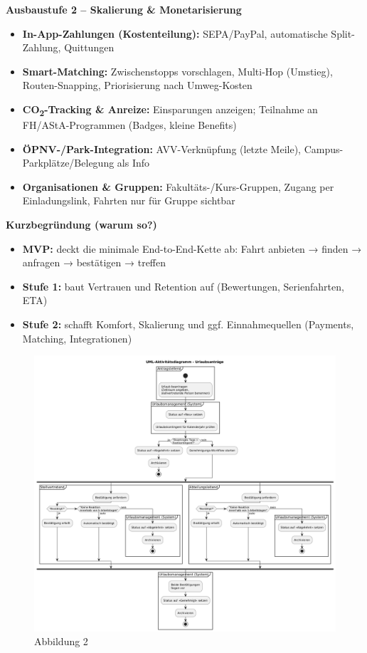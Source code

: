 \documentclass[12pt]{article}
\begin{document}
\textbf{Ausbaustufe 2 – Skalierung \& Monetarisierung}

\begin{itemize}
  \item \textbf{In-App-Zahlungen (Kostenteilung):} SEPA/PayPal, automatische Split-Zahlung, Quittungen
  \item \textbf{Smart-Matching:} Zwischenstopps vorschlagen, Multi-Hop (Umstieg), Routen-Snapping, Priorisierung nach Umweg-Kosten
  \item \textbf{CO\textsubscript{2}-Tracking \& Anreize:} Einsparungen anzeigen; Teilnahme an FH/AStA-Programmen (Badges, kleine Benefits)
  \item \textbf{ÖPNV-/Park-Integration:} AVV-Verknüpfung (letzte Meile), Campus-Parkplätze/Belegung als Info
  \item \textbf{Organisationen \& Gruppen:} Fakultäts-/Kurs-Gruppen, Zugang per Einladungslink, Fahrten nur für Gruppe sichtbar
\end{itemize}

\textbf{Kurzbegründung (warum so?)}

\begin{itemize}
  \item \textbf{MVP:} deckt die minimale End-to-End-Kette ab: Fahrt anbieten → finden → anfragen → bestätigen → treffen
  \item \textbf{Stufe 1:} baut Vertrauen und Retention auf (Bewertungen, Serienfahrten, ETA)
  \item \textbf{Stufe 2:} schafft Komfort, Skalierung und ggf. Einnahmequellen (Payments, Matching, Integrationen)
\end{itemize}

\begin{figure}[H]
  \centering
  \includegraphics[width=\linewidth,keepaspectratio]{2.png}
  \caption{Abbildung 2}
\end{figure}
\end{document}
